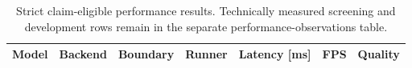 \begin{table}[t]
\centering
\small
\caption{Strict claim-eligible performance results. Technically measured screening and development rows remain in the separate performance-observations table.}
\label{tab:performance-results}
\begin{tabular}{lrrrrrr}
\toprule
Model & Backend & Boundary & Runner & Latency [ms] & FPS & Quality \\
\midrule
\bottomrule
\end{tabular}
\end{table}
